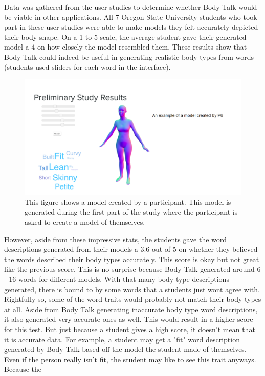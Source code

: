 \documentclass[journal]{vgtc}                %
\begin{document}
\noindent Data was gathered from the user studies to determine whether Body Talk would be viable in other applications. All 7 Oregon State University
students who took part in these user studies were able to make models they felt accurately depicted their body shape. On a 1 to 5 scale, the average
student gave their generated model a 4 on how closely the model resembled them. These results show that Body Talk could indeed be useful in generating
realistic body types from words (students used sliders for each word in the interface). \newline
\begin{figure}[!htb]
	\includegraphics[width=\columnwidth]{user_self_creation.png}
	\caption{This figure shows a model created by a participant. This model is generated during the first part of the study where the participant is asked to create a model of themselves.}
\end{figure}
\noindent However, aside from these impressive stats, the students gave the word descriptions generated from their models a 3.6 out of 5
on whether  they
believed the words described their body types accurately. This score is okay but not great like the previous score. This is no surprise
because Body Talk
generated around 6 - 16 words for different models. With that many body type descriptions generated, there is bound to by some words
that a students just
wont agree with. Rightfully so, some of the word traits would probably not match their body types at all. Aside from Body Talk
generating inaccurate body
type word descriptions, it also generated very accurate ones as well. This would result in a higher score for this test. But just
because a student gives
a high score, it doesn't mean that it is accurate data. For example, a student may get a "fit" word description generated by Body Talk
based off the
model the student made of themselves. Even if the person really isn't fit, the student may like to see this trait anyways. Because the
\end{document}
